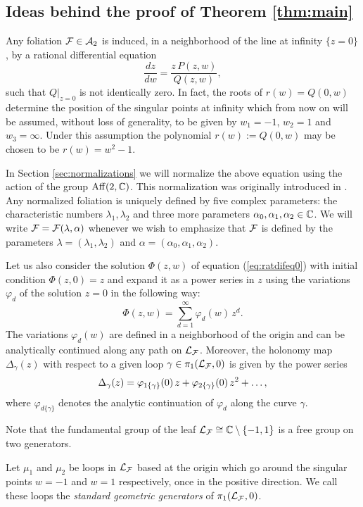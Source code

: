 


\subsection{Ideas behind the proof of Theorem \ref*{thm:main}}\label{subsec:ideas}
Any foliation $\mathcal{F}\in\mathcal{A}_2$ is induced, in a neighborhood of the line at infinity $\{z=0\}$, by a rational differential equation
\begin{equation}\label{eq:ratdifeq0}
\frac{dz}{dw}=\frac{z\,P(z,w)}{Q(z,w)},
\end{equation}
such that $Q\vert_{z=0}$ is not identically zero. In fact, the roots of $r(w)=Q(0,w)$ determine the position of the singular points at infinity which from now on will be assumed, without loss of generality, to be given by $w_1=-1$, $w_2=1$ and $w_3=\infty$. Under this assumption the polynomial $r(w):=Q(0,w)$ may be chosen to be $r(w)=w^2-1$. 

In Section \ref{sec:normalizations} we will normalize the above equation using the action of the group $\operatorname{Aff}({2},{\mathbb{C}})$. This normalization was originally introduced in \cite{Pyartli2000}. Any normalized foliation is uniquely defined by five complex parameters: the characteristic numbers $\lambda_1,\lambda_2$ and three more parameters $\alpha_0,\alpha_1,\alpha_2\in\mathbb{C}$. We will write $\mathcal{F}=\mathcal{F}(\lambda,\alpha)$ whenever we wish to emphasize that $\mathcal{F}$ is defined by the parameters $\lambda=(\lambda_1,\lambda_2)$ and $\alpha=(\alpha_0,\alpha_1,\alpha_2)$. 

Let us also consider the solution $\Phi(z,w)$ of  equation (\ref{eq:ratdifeq0}) with initial condition $\Phi(z,0)=z$ and expand it as a power series in $z$ using the variations $\varphi_d$ of the solution $z=0$ in the following way:
\[ \Phi(z,w)=\sum_{d=1}^{\infty} \varphi_d (w)\,z^d. \]
The variations $\varphi_d(w)$ are defined in a neighborhood of the origin and can be analytically continued along any path on $\mathcal{L}_{\mathcal{F}}$. Moreover, the holonomy map $\Delta_{\gamma}(z)$ with respect to a given loop $\gamma\in\pi_1(\mathcal{L}_{\mathcal{F}},0)$ is given by the power series
\begin{equation}\label{eq:powerseriesDelta}
\Delta_{\gamma}(z)=\varphi_{{1}\{\gamma_{{}}\}}(0)\,z + \varphi_{{2}\{\gamma_{{}}\}}(0)\,z^ 2 + \ldots,
\end{equation}
where $\varphi_{d\{\gamma\}}$ denotes the analytic continuation of $\varphi_d$ along the curve $\gamma$.

Note that the fundamental group of the leaf $\mathcal{L}_{\mathcal{F}}\cong\mathbb{C}\setminus\{-1,1\}$ is a free group on two generators.
\begin{definition}\label{def:geometricgenerators}
 Let $\mu_1$ and $\mu_2$ be loops in $\mathcal{L}_{\mathcal{F}}$ based at the origin which go around the singular points $w=-1$ and $w=1$ respectively, once in the positive direction. We call these loops the \emph{standard geometric generators} of $\pi_1(\mathcal{L}_{\mathcal{F}},0)$. 
\end{definition}


